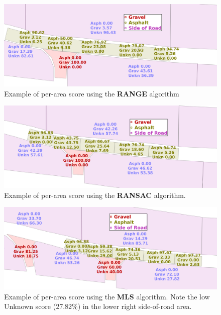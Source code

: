 \documentclass[numbered,pdftex]{ohio-etd}
\begin{document}
{{{		\begin{figure}[H]
			\centering
			\includegraphics[width=0.95\linewidth]{Defense_Images/range_actual_rm_db_4_area_score}
			\caption[Area Scores: RANGE]{Example of per-area score using the \textbf{RANGE} algorithm}
			\label{fig:range_example_area_score}
		\end{figure}
	
		\begin{figure}[H]
			\centering
			\includegraphics[width=0.95\linewidth]{Defense_Images/ransac_actual_db_4_area_score}
			\caption[Area Scores: RANSAC]{Example of per-area score using the \textbf{RANSAC} algorithm.}
			\label{fig:ransac_example_area_score}
		\end{figure}
	
		\begin{figure}[H]
			\centering
			\includegraphics[width=0.95\linewidth]{Defense_Images/mls_db_4_area_scores}
			\caption[Area Scores: MLS]{Example of per-area score using the \textbf{MLS} algorithm. Note the low Unknown score (27.82\%) in the lower right side-of-road area.}
			\label{fig:mls_example_area_score}
		\end{figure}
	
}}}
\end{document}
